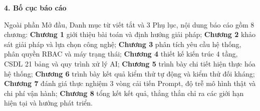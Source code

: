 \textbf{4. Bố cục báo cáo}

Ngoài phần Mở đầu, Danh mục từ viết tắt và 3 Phụ lục, nội dung báo cáo gồm 8 chương: \textbf{Chương 1} giới thiệu bài toán và định hướng giải pháp; \textbf{Chương 2} khảo sát giải pháp và lựa chọn công nghệ; \textbf{Chương 3} phân tích yêu cầu hệ thống, phân quyền RBAC và máy trạng thái; \textbf{Chương 4} thiết kế kiến trúc 4 tầng, CSDL 21 bảng và quy trình xử lý AI; \textbf{Chương 5} trình bày chi tiết hiện thực hóa hệ thống; \textbf{Chương 6} trình bày kết quả kiểm thử tự động và kiểm thử đối kháng; \textbf{Chương 7} đánh giá thực nghiệm 3 vòng cải tiến Prompt, độ trễ mô hình thật và chi phí vận hành; \textbf{Chương 8} tổng kết kết quả, thẳng thắn chỉ ra các giới hạn hiện tại và hướng phát triển.
